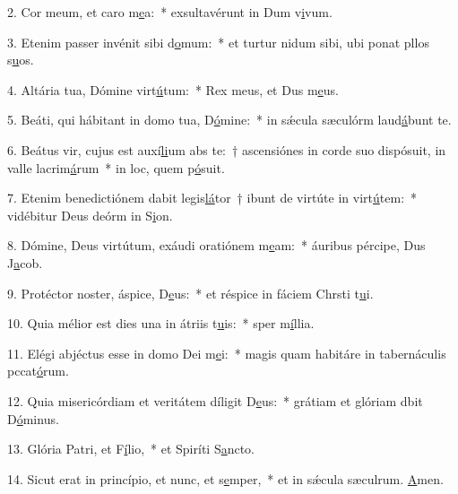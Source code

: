 2. Cor meum, et caro m\uline{e}a:~* exsultavérunt in Dum v\uline{i}vum.\par 
3. Etenim passer invénit sibi d\uline{o}mum:~* et turtur nidum sibi, ubi ponat pllos s\uline{u}os.\par 
4. Altária tua, Dómine virt\uline{ú}tum:~* Rex meus, et Dus m\uline{e}us.\par 
5. Beáti, qui hábitant in domo tua, D\uline{ó}mine:~* in sǽcula sæculórm laud\uline{á}bunt te.\par 
6. Beátus vir, cujus est auxí\uline{li}um abs te:~† ascensiónes in corde suo dispósuit, in valle lacrim\uline{á}rum~* in loc, quem p\uline{ó}suit.\par 
7. Etenim benedictiónem dabit legis\uline{lá}tor~† ibunt de virtúte in virt\uline{ú}tem:~* vidébitur Deus deórm in S\uline{i}on.\par 
8. Dómine, Deus virtútum, exáudi oratiónem m\uline{e}am:~* áuribus pércipe, Dus J\uline{a}cob.\par 
9. Protéctor noster, áspice, D\uline{e}us:~* et réspice in fáciem Chrsti t\uline{u}i.\par 
10. Quia mélior est dies una in átriis t\uline{u}is:~* sper m\uline{í}llia.\par 
11. Elégi abjéctus esse in domo Dei m\uline{e}i:~* magis quam habitáre in tabernáculis pccat\uline{ó}rum.\par 
12. Quia misericórdiam et veritátem díligit D\uline{e}us:~* grátiam et glóriam dbit D\uline{ó}minus.\par 
13. Glória Patri, et F\uline{í}lio,~* et Spiríti S\uline{a}ncto.\par 
14. Sicut erat in princípio, et nunc, et s\uline{e}mper,~* et in sǽcula sæculrum. \uline{A}men.\par 
